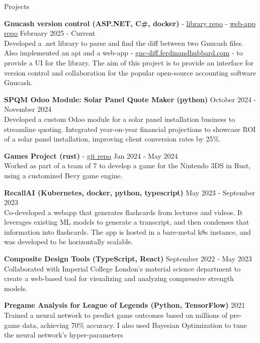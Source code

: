 \documentclass{resume} %
\begin{document}
\begin{rSection}{Projects}
\vspace{-1.25em}

\item \textbf{Gnucash version control (ASP.NET, C\#, docker)} - \href{https://github.com/ferdinandhubbard981/gnucash-diff}{library repo} - \href{https://github.com/ferdinandhubbard981/gnucash-version-control-web}{web-app repo} \hfill February 2025 - Current \\
Developed a .net library to parse and find the diff between two Gnucash files. Also implemented an api and a web-app - \href{https://gnc-diff.ferdinandhubbard.com}{gnc-diff.ferdinandhubbard.com} - to provide a UI for the library. The aim of this project is to provide an interface for version control and collaboration for the popular open-source accounting software Gnucash.

\item \textbf{SPQM Odoo Module: Solar Panel Quote Maker (python)} \hfill October 2024 - November 2024 \\
Developed a custom Odoo module for a solar panel installation business to streamline quoting. Integrated year-on-year financial projections to showcase ROI of a solar panel installation, improving client conversion rates by 25\%. 

\item \textbf{Games Project (rust)} - \href{https://github.com/Team-Yarg/these\_times\_of\_mine}{git repo} \hfill Jan 2024 - May 2024 \\
Worked as part of a team of 7 to develop a game for the Nintendo 3DS in Rust, using a customized Bevy game engine.

\item \textbf{RecallAI (Kubernetes, docker, python, typescript)} \hfill May 2023 - September 2023 \\
Co-developed a webapp that generates flashcards from lectures and videos. It leverages existing ML models to generate a transcript, and then condenses that information into flashcards. The app is hosted in a bare-metal k8s instance, and was developed to be horizontally scalable.

\item \textbf{Composite Design Tools (TypeScript, React)} \hfill September 2022 - May 2023 \\
Collaborated with Imperial College London's material science department to create a web-based tool for visualizing and analyzing compressive strength models.

\item \textbf{Pregame Analysis for League of Legends (Python, TensorFlow)} \hfill 2021 \\
Trained a neural network to predict game outcomes based on millions of pre-game data, achieving 70\% accuracy. I also used Bayesian Optimization to tune the neural network's hyper-parameters

\end{rSection}
\end{document}
